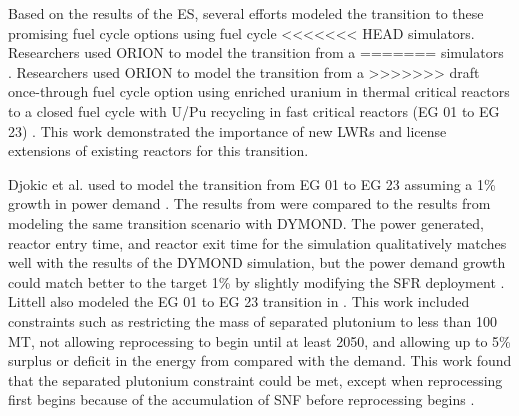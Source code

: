 Based on the results of the \gls{ES}, several efforts modeled 
the transition to these promising fuel cycle options using fuel cycle 
<<<<<<< HEAD
simulators. Researchers used ORION to model the transition from a 
=======
simulators \cite{sunny_transition_2015,djokic_application_2015,feng_standardized_2016,bae_standardized_2019,littell_development_2016}. 
Researchers used ORION to model the transition from a 
>>>>>>> draft
once-through fuel cycle option using enriched uranium in thermal critical 
reactors to a closed fuel cycle with U/Pu recycling in fast 
critical reactors (\gls{EG} 01 to \gls{EG} 23) \cite{sunny_transition_2015}.
This work 
demonstrated the importance of new \glspl{LWR} and license 
extensions of existing reactors for this transition. 

Djokic et al. used \Cyclus to model the transition from \gls{EG} 01 to \gls{EG} 
23 assuming a 1\% growth in power demand 
\cite{djokic_application_2015}. The results from \Cyclus were compared 
to the results from modeling the same transition scenario with \gls{DYMOND}. 
The power generated, reactor entry 
time, and reactor exit time for the \Cyclus simulation qualitatively 
matches well with the results of the \gls{DYMOND} simulation, but the power 
demand growth could match better to the target 1\% by slightly modifying 
the \gls{SFR} deployment \cite{djokic_application_2015}. Littell 
\cite{littell_development_2016}
also modeled the \gls{EG} 01 to \gls{EG} 23 transition in \Cyclus. 
This work included constraints such as restricting the mass of separated 
plutonium to less than 100 MT, not allowing reprocessing to begin until 
at least 2050, and allowing up to 5\% surplus or deficit in the energy 
from compared with the demand. This work found that the separated 
plutonium constraint could be met, except when reprocessing first 
begins because of the accumulation of \gls{SNF} before 
reprocessing begins \cite{littell_development_2016}. 

%
%
%
